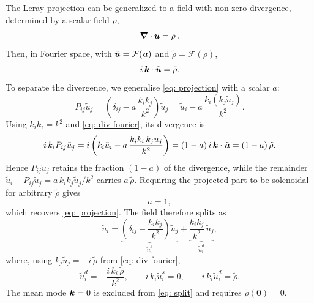 \documentclass{article}
\begin{document}
The Leray projection can be generalized to a field with non-zero
divergence, determined by a scalar field $\rho$,
\begin{equation}
    \label{eq: div non-zero}
    \nab \cdot \uu = \rho \,.
\end{equation}
Then, in Fourier space, with $\tilde{\uu} = \mathcal{F}(\uu)$ and
$\tilde{\rho} = \mathcal{F}(\rho)$,
\begin{equation}
    \label{eq: div fourier}
    i\, \kk \cdot \tilde{\uu} = \tilde{\rho} .
\end{equation}
To separate the divergence, we generalise \ref{eq: projection} with a scalar $a$:
\begin{equation}
    \label{eq: projection a}
    P_{ij} \tilde{u}_j
    = \left(\delta_{ij} - a\, \frac{k_i k_j}{k^2}\right) \tilde{u}_j
    = \tilde{u}_i - a\, \frac{k_i \left(k_j \tilde{u}_j\right)}{k^2} .
\end{equation}
Using $k_i k_i = k^2$ and \ref{eq: div fourier}, its divergence is
\begin{equation}
    \label{eq: div projection a}
    i\, k_i P_{ij} \tilde{u}_j
    = i \left(k_i \tilde{u}_i - a\, \frac{k_i k_i \, k_j \tilde{u}_j}{k^2}\right)
    = (1 - a)\, i\, \kk \cdot \tilde{\uu}
    = (1 - a)\, \tilde{\rho} .
\end{equation}
Hence $P_{ij}\tilde{u}_j$ retains the fraction $(1-a)$ of the divergence, while the
remainder $\tilde{u}_i - P_{ij}\tilde{u}_j = a\, k_i k_j \tilde{u}_j / k^2$ carries
$a\,\tilde{\rho}$. Requiring the projected part to be solenoidal for arbitrary
$\tilde{\rho}$ gives
\begin{equation}
    \label{eq: a value}
    a = 1 ,
\end{equation}
which recovers \ref{eq: projection}. 
The field therefore splits as
\begin{equation}
    \label{eq: split}
    \tilde{u}_i
    = \underbrace{\left(\delta_{ij} - \frac{k_i k_j}{k^2}\right)\tilde{u}_j}_{\tilde{u}_i^{s}}
    + \underbrace{\frac{k_i k_j}{k^2}\,\tilde{u}_j}_{\tilde{u}_i^{d}} ,
\end{equation}
where, using $k_j \tilde{u}_j = -i\,\tilde{\rho}$ from \ref{eq: div fourier},
\begin{equation}
    \label{eq: dilatational part}
    \tilde{u}_i^{d} = -\frac{i\, k_i\, \tilde{\rho}}{k^2},
    \qquad
    i\, k_i \tilde{u}_i^{s} = 0,
    \qquad
    i\, k_i \tilde{u}_i^{d} = \tilde{\rho} .
\end{equation}
The mean mode $\kk = 0$ is excluded from \ref{eq: split} and requires
$\tilde{\rho}(\mathbf{0}) = 0$.
\end{document}
